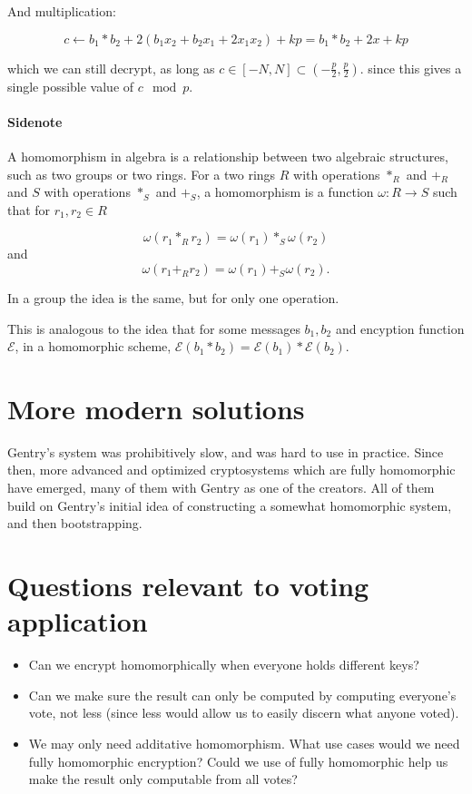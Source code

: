\documentclass{article}
\begin{document}
And multiplication:

$$ c \leftarrow b_1 * b_2 + 2(b_1 x_2 + b_2 x_1 + 2x_1 x_2) + kp = b_1*b_2 + 2x + kp$$

which we can still decrypt, as long as $c \in [-N, N] \subset (-\frac{p}{2}, \frac{p}{2})$. since this gives a single possible value of $c \mod p$.

\paragraph{Sidenote}
A homomorphism in algebra is a relationship between two algebraic structures, such as two groups or two rings. For a two rings $R$ with operations $*_R$ and $+_R$  and $S$ with operations $*_S$ and $+_S$, a homomorphism is a function $\omega: R \rightarrow S$ such that for $r_1, r_2 \in R$

$$ \omega(r_1 *_R r_2) = \omega(r_1) *_S \omega(r_2)$$
\noindent and
$$ \omega(r_1 +_R r_2) = \omega(r_1) +_S \omega(r_2).$$

\noindent In a group the idea is the same, but for only one operation.

This is analogous to the idea that for some messages $b_1, b_2$ and encyption function $\mathcal{E}$, in a homomorphic scheme, $\mathcal{E}(b_1 * b_2)  = \mathcal{E}(b_1) * \mathcal{E}(b_2)$.

\section{More modern solutions}

Gentry's system was prohibitively slow, and was hard to use in practice. Since then, more advanced and optimized cryptosystems which are fully homomorphic have emerged, many of them with Gentry as one of the creators. All of them build on Gentry's initial idea of constructing a somewhat homomorphic system, and then bootstrapping.

\section{Questions relevant to voting application}

\begin{itemize}
    \item Can we encrypt homomorphically when everyone holds different keys?
    \item Can we make sure the result can only be computed by computing everyone's vote, not less (since less would allow us to easily discern what anyone voted).
    \item We may only need additative homomorphism. What use cases would we need fully homomorphic encryption? Could we use of fully homomorphic help us make the result only computable from all votes?
\end{itemize}
\end{document}
